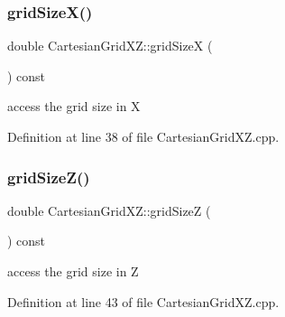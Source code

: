 \hypertarget{class_d_d4hep_1_1_geometry_1_1_cartesian_grid_x_z_a61d98a06d62e5456eae54727cae54e0b}{}\label{class_d_d4hep_1_1_geometry_1_1_cartesian_grid_x_z_a61d98a06d62e5456eae54727cae54e0b} 
\subsubsection{\texorpdfstring{grid\+Size\+X()}{gridSizeX()}}
{\footnotesize\ttfamily double Cartesian\+Grid\+X\+Z\+::grid\+SizeX (\begin{DoxyParamCaption}{ }\end{DoxyParamCaption}) const}



access the grid size in X 



Definition at line 38 of file Cartesian\+Grid\+X\+Z.\+cpp.

\hypertarget{class_d_d4hep_1_1_geometry_1_1_cartesian_grid_x_z_a2a9f3d650000f7bdc2ccf91ce7b9e2cd}{}\label{class_d_d4hep_1_1_geometry_1_1_cartesian_grid_x_z_a2a9f3d650000f7bdc2ccf91ce7b9e2cd} 
\subsubsection{\texorpdfstring{grid\+Size\+Z()}{gridSizeZ()}}
{\footnotesize\ttfamily double Cartesian\+Grid\+X\+Z\+::grid\+SizeZ (\begin{DoxyParamCaption}{ }\end{DoxyParamCaption}) const}



access the grid size in Z 



Definition at line 43 of file Cartesian\+Grid\+X\+Z.\+cpp.

\hypertarget{class_d_d4hep_1_1_geometry_1_1_cartesian_grid_x_z_ac19b3c707b7fe23d04c9e1615ba20158}{}\label{class_d_d4hep_1_1_geometry_1_1_cartesian_grid_x_z_ac19b3c707b7fe23d04c9e1615ba20158} 
